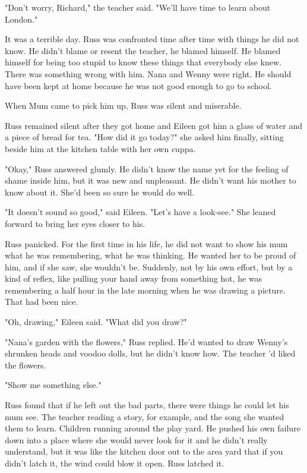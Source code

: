 "Don't worry, Richard," the teacher said. "We'll have time to learn about London."

It was a terrible day. Russ was confronted time after time with things he did not know. He didn't blame or resent the teacher, he blamed himself. He blamed himself for being too stupid to know these things that everybody else knew. There was something wrong with him. Nana and Wenny were right. He should have been kept at home because he was not good enough to go to school.

When Mum came to pick him up, Russ was silent and miserable.

Russ remained silent after they got home and Eileen got him a glass of water and a piece of bread for tea. "How did it go today?" she asked him finally, sitting beside him at the kitchen table with her own cuppa.

"Okay," Russ answered glumly. He didn't know the name yet for the feeling of shame inside him, but it was new and unpleasant. He didn't want his mother to know about it. She'd been so sure he would do well.

"It doesn't sound so good," said Eileen. "Let's have a look-see." She leaned forward to bring her eyes closer to his.

Russ panicked. For the first time in his life, he did not want to show his mum what he was remembering, what he was thinking. He wanted her to be proud of him, and if she saw, she wouldn't be. Suddenly, not by his own effort, but by a kind of reflex, like pulling your hand away from something hot, he was remembering a half hour in the late morning when he was drawing a picture. That had been nice.

"Oh, drawing," Eileen said. "What did you draw?"

"Nana's garden with the flowers," Russ replied. He'd wanted to draw Wenny's shrunken heads and voodoo dolls, but he didn't know how. The teacher 'd liked the flowers.

"Show me something else."

Russ found that if he left out the bad parts, there were things he could let his mum see. The teacher reading a story, for example, and the song she wanted them to learn. Children running around the play yard. He pushed his own failure down into a place where she would never look for it and{\el} he didn't really understand, but it was like the kitchen door out to the area yard that if you didn't latch it, the wind could blow it open. Russ latched it.

